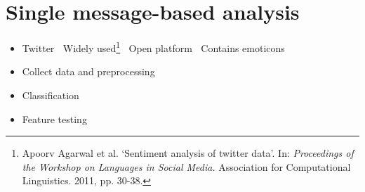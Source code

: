 \documentclass[
paper=128mm:96mm, %
fontsize=11pt, %
pagesize, %
parskip=half-, %
]{scrartcl} %
\newcommand{\red}[1]{\textit{\color{red}{#1}}}
\theoremstyle{mythmstyle} %
\begin{document}

\clearpage


\section{Single message-based analysis}


\begin{itemize}
\item Twitter
\subitem \textbullet $\:$ Widely used\footnote{Apoorv Agarwal et al. `Sentiment analysis of twitter data'. In: \textit{Proceedings of the Workshop on Languages in Social Media.} Association for Computational Linguistics. 2011, pp. 30-38. }
\subitem \textbullet $\:$ Open platform
\subitem \textbullet $\:$ Contains emoticons

\item Collect data and preprocessing
\item Classification
\item Feature testing
\end{itemize}
\end{document}
